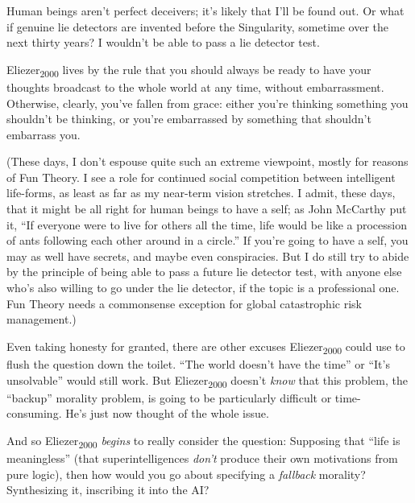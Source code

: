 {
 Human beings aren't perfect deceivers;
it's likely that I'll be found out. Or
what if genuine lie detectors are invented before the Singularity,
sometime over the next thirty years? I wouldn't be able
to pass a lie detector test.}

{
 Eliezer\textsubscript{2000} lives by the rule that you should
always be ready to have your thoughts broadcast to the whole world at
any time, without embarrassment. Otherwise, clearly,
you've fallen from grace: either you're
thinking something you shouldn't be thinking, or
you're embarrassed by something that
shouldn't embarrass you.}

{
 (These days, I don't espouse quite such an extreme
viewpoint, mostly for reasons of Fun Theory. I see a role for continued
social competition between intelligent life-forms, as least as far as
my near-term vision stretches. I admit, these days, that it might be
all right for human beings to have a self; as John McCarthy put it,
``If everyone were to live for others all the time,
life would be like a procession of ants following each other around in
a circle.'' If you're going to have a
self, you may as well have secrets, and maybe even conspiracies. But I
do still try to abide by the principle of being able to pass a future
lie detector test, with anyone else who's also willing
to go under the lie detector, if the topic is a professional one. Fun
Theory needs a commonsense exception for global catastrophic risk
management.)}

{
 Even taking honesty for granted, there are other excuses
Eliezer\textsubscript{2000} could use to flush the question down the
toilet. ``The world doesn't have the
time'' or ``It's
unsolvable'' would still work. But
Eliezer\textsubscript{2000} doesn't \textit{know} that
this problem, the ``backup''
morality problem, is going to be particularly difficult or
time-consuming. He's just now thought of the whole
issue.}

{
 And so Eliezer\textsubscript{2000} \textit{begins} to really
consider the question: Supposing that ``life is
meaningless'' (that superintelligences
\textit{don't} produce their own motivations from pure
logic), then how would you go about specifying a \textit{fallback}
morality? Synthesizing it, inscribing it into the AI?}

